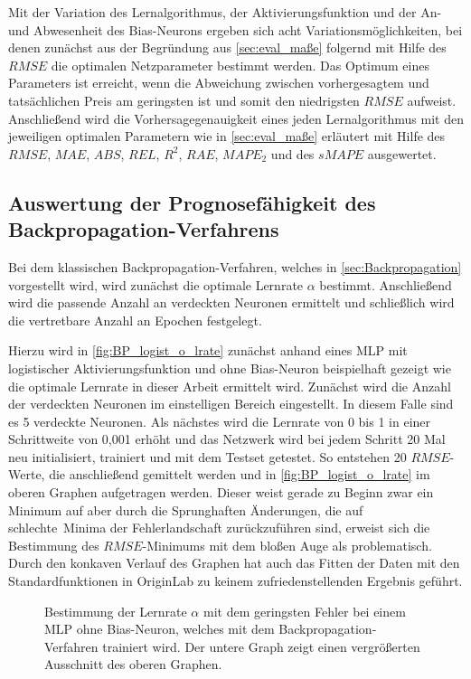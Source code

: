 Mit der Variation des Lernalgorithmus, der Aktivierungsfunktion und der An- und Abwesenheit des Bias-Neurons ergeben sich acht Variationsmöglichkeiten, bei denen zunächst aus der Begründung aus \autoref{sec:eval_maße} folgernd mit Hilfe des $RMSE$ die optimalen Netzparameter bestimmt werden. Das Optimum eines Parameters ist erreicht, wenn die Abweichung zwischen vorhergesagtem und tatsächlichen Preis am geringsten ist und somit den niedrigsten $RMSE$ aufweist. Anschließend wird die Vorhersagegenauigkeit eines jeden Lernalgorithmus mit den jeweiligen optimalen Parametern wie in \autoref{sec:eval_maße} erläutert mit Hilfe des $RMSE$, $MAE$, $ABS$, $REL$, $R^2$, $RAE$, $MAPE_2$ und des $sMAPE$ ausgewertet.




\subsection{Auswertung der Prognosefähigkeit des Backpropagation-Verfahrens}\label{sec:aus_backprop}

Bei dem klassischen Backpropagation-Verfahren, welches in \autoref{sec:Backpropagation} vorgestellt wird, wird zunächst die optimale Lernrate $\alpha$ bestimmt. Anschließend wird die passende Anzahl an verdeckten Neuronen ermittelt und schließlich wird die vertretbare Anzahl an Epochen festgelegt.

Hierzu wird in \autoref{fig:BP_logist_o_lrate} zunächst anhand eines MLP mit logistischer Aktivierungsfunktion und ohne Bias-Neuron beispielhaft gezeigt wie die optimale Lernrate in dieser Arbeit ermittelt wird. Zunächst wird die Anzahl der verdeckten Neuronen im einstelligen Bereich eingestellt. In diesem Falle sind es 5 verdeckte Neuronen. Als nächstes wird die Lernrate von 0 bis 1 in einer Schrittweite von 0,001 erhöht und das Netzwerk wird bei jedem Schritt 20 Mal neu initialisiert, trainiert und mit dem Testset getestet. So entstehen 20 $RMSE$-Werte, die anschließend gemittelt werden und in \autoref{fig:BP_logist_o_lrate} im oberen Graphen aufgetragen werden. Dieser weist gerade zu Beginn zwar ein Minimum auf aber durch die Sprunghaften Änderungen, die auf \glqq schlechte\grqq~Minima der Fehlerlandschaft zurückzuführen sind, erweist sich die Bestimmung des $RMSE$-Minimums mit dem bloßen Auge als problematisch. Durch den konkaven Verlauf des Graphen hat auch das Fitten der Daten mit den Standardfunktionen in OriginLab zu keinem zufriedenstellenden Ergebnis geführt.

\begin{figure}[!htb]
    \centering
        
    \caption[Beispiel zur Bestimmung der Lernrate $\alpha$ beim BP-Verf.]{Bestimmung der Lernrate $\alpha$ mit dem geringsten Fehler bei einem MLP ohne Bias-Neuron, welches mit dem Backpropagation-Verfahren trainiert wird. Der untere Graph zeigt einen vergrößerten Ausschnitt des oberen Graphen.}
    \label{fig:BP_logist_o_lrate}
\end{figure}

